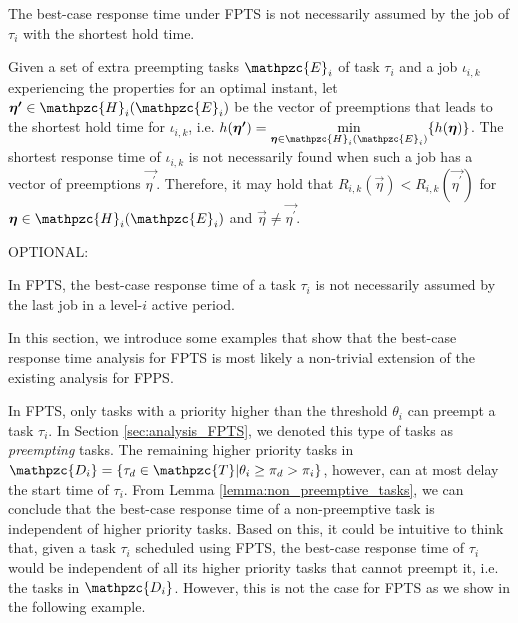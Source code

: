 \begin{fact} \label{cor:shortest_hold_time}The best-case response time under FPTS is not necessarily assumed by the job of $\tau_i$ with the shortest hold time.
\end{fact}


\begin{fact}\label{fct:active_period}
	Given a set of extra preempting tasks $\mathpzc{E}_i$ of task $\tau_i$ and a job $\iota_{i,k}$ experiencing the properties for an optimal instant, let $\vec{\eta^{\prime}} \in \mathpzc{H}_i(\mathpzc{E}_i)$ be the vector of preemptions that leads to the shortest hold time for $\iota_{i,k}$, i.e. $h(\vec{\eta^{\prime}}) = \min\limits_{\vec{\eta} \in \mathpzc{H}_i(\mathpzc{E}_i)}\{h(\vec{\eta})\}$. The shortest response time of $\iota_{i,k}$ is not necessarily found when such a job has a vector of preemptions $\vec{\eta^{\prime}}$. Therefore, it may hold that $R_{i,k}(\vec{\eta})<R_{i,k}(\vec{\eta^{\prime}})$ for $\vec{\eta} \in \mathpzc{H}_i(\mathpzc{E}_i)$ and $\vec{\eta} \neq \vec{\eta^{\prime}}$.
\end{fact}


OPTIONAL:
\begin{fact}\label{fct:active_period}
	In FPTS, the best-case response time of a task $\tau_i$ is not necessarily assumed by the last job in a level-$i$ active period.
\end{fact}

\iffalse
In this section, we introduce some examples that show that the best-case response time analysis for FPTS is most likely a non-trivial extension of the existing analysis for FPPS.

In FPTS, only tasks with a priority higher than the threshold $\theta_i$ can preempt a task $\tau_i$. In Section \ref{sec:analysis_FPTS}, we denoted this type of tasks as \textit{preempting} tasks. The remaining higher priority tasks in $\mathpzc{D_i}=\{\tau_d \in \mathpzc{T}|\theta_i \geq \pi_d > \pi_i\}$, however, can at most delay the start time of $\tau_i$. From Lemma \ref{lemma:non_preemptive_tasks}, we can conclude that the best-case response time of a non-preemptive task  is independent of higher priority tasks. Based on this, it could be intuitive to think that, given a task $\tau_i$ scheduled using FPTS, the best-case response time of $\tau_i$ would be independent of all its higher priority tasks that cannot preempt it, i.e. the tasks in $\mathpzc{D_i}$. However, this is not the case for FPTS as we show in the following example.

